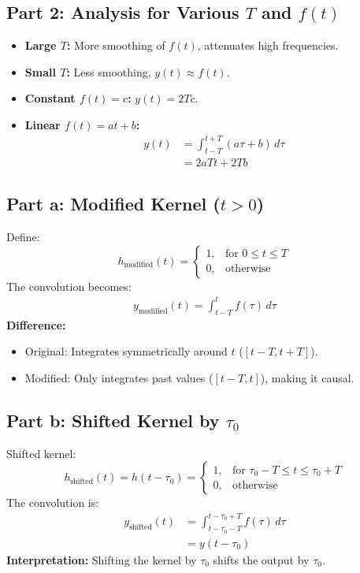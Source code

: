 \documentclass{article}
\begin{document}
\subsection*{Part 2: Analysis for Various $T$ and $f(t)$}
\begin{itemize}
    \item \textbf{Large $T$:} More smoothing of $f(t)$, attenuates high frequencies.
    \item \textbf{Small $T$:} Less smoothing, $y(t) \approx f(t)$.
    \item \textbf{Constant $f(t) = c$:} $y(t) = 2T c$.
    \item \textbf{Linear $f(t) = a t + b$:} 
    \begin{align*}
    y(t) &= \int_{t - T}^{t + T} (a \tau + b) \,d\tau \\
         &= 2a T t + 2T b
    \end{align*}
\end{itemize}

\subsection*{Part a: Modified Kernel ($t > 0$)}
Define:
\[
h_{\text{modified}}(t)=
\begin{cases}
    1, & \text{for } 0 \leq t \leq T \\
    0, & \text{otherwise}
\end{cases}
\]
The convolution becomes:
\begin{align*}
y_{\text{modified}}(t) = \int_{t - T}^{t} f(\tau) \,d\tau
\end{align*}
\textbf{Difference:}
\begin{itemize}
    \item Original: Integrates symmetrically around $t$ ($[t - T, t + T]$).
    \item Modified: Only integrates past values ($[t - T, t]$), making it causal.
\end{itemize}

\subsection*{Part b: Shifted Kernel by $\tau_0$}
Shifted kernel:
\[
h_{\text{shifted}}(t) = h(t - \tau_0) =
\begin{cases}
    1, & \text{for } \tau_0 - T \leq t \leq \tau_0 + T \\
    0, & \text{otherwise}
\end{cases}
\]
The convolution is:
\begin{align*}
y_{\text{shifted}}(t) &= \int_{t - \tau_0 - T}^{t - \tau_0 + T} f(\tau) \,d\tau \\
                      &= y(t - \tau_0)
\end{align*}
\textbf{Interpretation:} Shifting the kernel by $\tau_0$ shifts the output by $\tau_0$.
\end{document}
